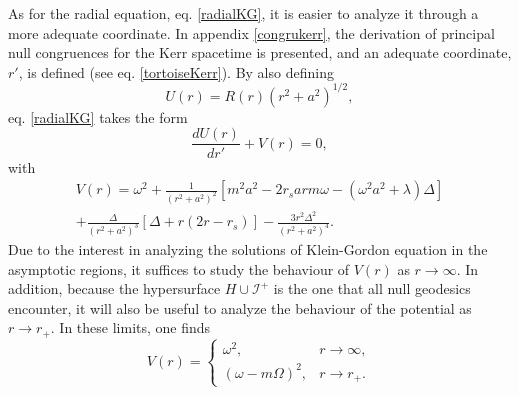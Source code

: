 \documentclass[
12pt,		%
openright,	%
twoside,  %
a4paper,			%
chapter=TITLE,		%
english,			%
french,				%
spanish,			%
brazil				%
]{USPSC-classe/USPSC}
\begin{document}
As for the radial equation, eq. \ref{radialKG}, it is easier to analyze it through a more adequate coordinate. In appendix \ref{congrukerr}, the derivation of principal null congruences for the Kerr spacetime is presented, and an adequate coordinate,   $r'$, is defined (see eq. \ref{tortoiseKerr}). By also defining
\begin{equation}
    U(r)=R(r)(r^2+a^2)^{1/2},
\end{equation}
eq. \ref{radialKG} takes the form
\begin{equation}
    \frac{dU(r)}{dr'}+V(r)=0,
\end{equation}
with 
\begin{multline}\label{potential}
    V(r)=\omega^2+\frac{1}{(r^2+a^2)^2}\left[m^2a^2-2r_sarm\omega-(\omega^2a^2+\lambda)\Delta\right]\\+\frac{\Delta}{(r^2+a^2)^3}\left[\Delta+r(2r-r_s)\right]-\frac{3r^2\Delta^2}{(r^2+a^2)^4}.
\end{multline}
Due to the interest in analyzing the solutions of Klein-Gordon equation in the asymptotic regions, it suffices to study the behaviour of $V(r)$ as $r\to\infty$. In addition, because the hypersurface $H\cup\mathscr{I}^+$ is the one that all null geodesics encounter, it will also be useful to analyze the behaviour of the potential as $r\to r_+$. In these limits, one finds
\begin{equation}\label{eq5}
    V(r)=
     \begin{cases}
      \omega^2, & r\to \infty, \\
      (\omega-m\Omega)^2, & r\to r_+.
    \end{cases}
\end{equation}
\end{document}
